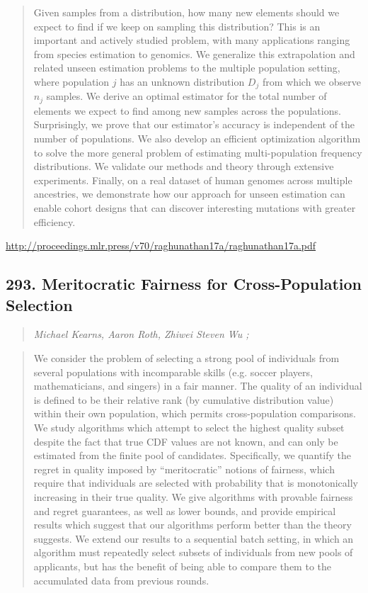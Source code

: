 \documentclass{article}
\begin{document}
\begin{quote}
    Given samples from a distribution, how many new elements should we expect to find if we keep on sampling this distribution? This is an important and actively studied problem, with many applications ranging from species estimation to genomics. We generalize this extrapolation and related unseen estimation problems to the multiple population setting, where population $j$ has an unknown distribution $D_j$ from which we observe $n_j$ samples. We derive an optimal estimator for the total number of elements we expect to find among new samples across the populations. Surprisingly, we prove that our estimator’s accuracy is independent of the number of populations. We also develop an efficient optimization algorithm to solve the more general problem of estimating multi-population frequency distributions. We validate our methods and theory through extensive experiments. Finally, on a real dataset of human genomes across multiple ancestries, we demonstrate how our approach for unseen estimation can enable cohort designs that can discover interesting mutations with greater efficiency.  
\end{quote}

\href{http://proceedings.mlr.press/v70/raghunathan17a/raghunathan17a.pdf}{http://proceedings.mlr.press/v70/raghunathan17a/raghunathan17a.pdf}

\subsection{293. Meritocratic Fairness for Cross-Population Selection}

\begin{quote}
\footnotesize{\textit{Michael Kearns, Aaron Roth, Zhiwei Steven Wu ;}}

\end{quote}

\begin{quote}
    We consider the problem of selecting a strong pool of individuals from several populations with incomparable skills (e.g. soccer players, mathematicians, and singers) in a fair manner. The quality of an individual is defined to be their relative rank (by cumulative distribution value) within their own population, which permits cross-population comparisons. We study algorithms which attempt to select the highest quality subset despite the fact that true CDF values are not known, and can only be estimated from the finite pool of candidates. Specifically, we quantify the regret in quality imposed by “meritocratic” notions of fairness, which require that individuals are selected with probability that is monotonically increasing in their true quality. We give algorithms with provable fairness and regret guarantees, as well as lower bounds, and provide empirical results which suggest that our algorithms perform better than the theory suggests. We extend our results to a sequential batch setting, in which an algorithm must repeatedly select subsets of individuals from new pools of applicants, but has the benefit of being able to compare them to the accumulated data from previous rounds.  
\end{quote}
\end{document}
